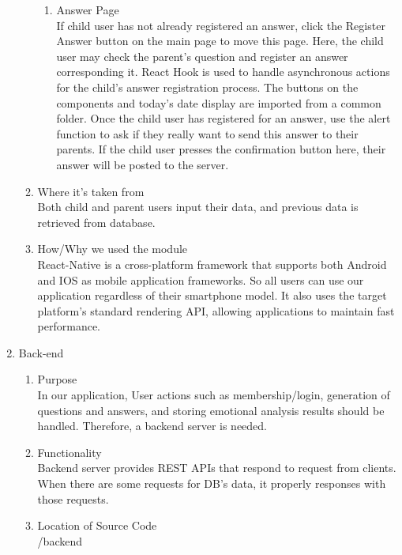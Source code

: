 \documentclass[conference]{IEEEtran}
\begin{document}
\begin{enumerate}
\begin{enumerate}
\begin{enumerate}
               \item Answer Page
               \\If child user has not already registered an answer, click the Register Answer button on the main page to move this page. Here, the child user may check the parent's question and register an answer corresponding it. React Hook is used to handle asynchronous actions for the child's answer registration process. The buttons on the components and today's date display are imported from a common folder. Once the child user has registered for an answer, use the alert function to ask if they really want to send this answer to their parents. If the child user presses the confirmation button here, their answer will be posted to the server.
               
           \end{enumerate}
           \item Where it’s taken from
           \\Both child and parent users input their data, and previous data is retrieved from database.
           
           \item How/Why we used the module
           \\React-Native is a cross-platform framework that supports both Android and IOS as mobile application frameworks. So all users can use our application regardless of their smartphone model. It also uses the target platform's standard rendering API, allowing applications to maintain fast performance.
           
       \end{enumerate}
    \item Back-end
        \begin{enumerate}
        \item Purpose
        \\In our application, User actions such as membership/login, generation of questions and answers, and storing emotional analysis results should be handled. Therefore, a backend server is needed.
        
        \item Functionality
        \\Backend server provides REST APIs that respond to request from clients. When there are some requests for DB’s data, it properly responses with those requests. 
        
        \item Location of Source Code
        \\/backend
        

\end{enumerate}
\end{enumerate}
\end{document}
